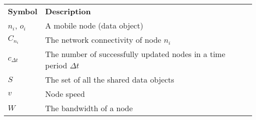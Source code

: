 {
\renewcommand*{\arraystretch}{1.2}
\begin{longtable}{p{} p{}}
		\textbf{Symbol} & \textbf{Description} \\
		$n_i$, $o_i$ & A mobile node (data object)\\
		$C_{n_i}$ & The network connectivity of node $n_i$ \\
		$c_{\varDelta t}$ & The number of successfully updated nodes in a time period $\varDelta t$ \\
		$S$ & The set of all the shared data objects\\
		
		$v$ & Node speed \\
		$W$ & The bandwidth of a node \\
\end{longtable}
}